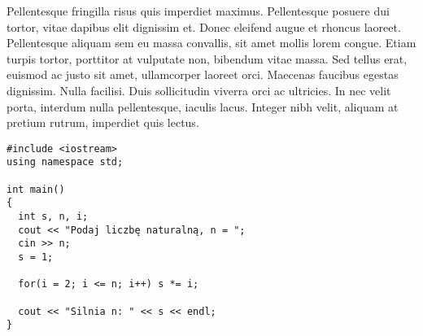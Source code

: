 \documentclass[11pt,a4paper]{article}
\begin{document}
Pellentesque fringilla risus quis imperdiet maximus. Pellentesque posuere dui tortor, vitae dapibus elit dignissim et. Donec eleifend augue et rhoncus laoreet. Pellentesque aliquam sem eu massa convallis, sit amet mollis lorem congue. Etiam turpis tortor, porttitor at vulputate non, bibendum vitae massa. Sed tellus erat, euismod ac justo sit amet, ullamcorper laoreet orci. Maecenas faucibus egestas dignissim. Nulla facilisi. Duis sollicitudin viverra orci ac ultricies. In nec velit porta, interdum nulla pellentesque, iaculis lacus. Integer nibh velit, aliquam at pretium rutrum, imperdiet quis lectus. 

\begin{lstlisting}[caption=tytuł1,label=lst:sil2,float=t,frame=single]
#include <iostream>
using namespace std;

int main()
{
  int s, n, i;  
  cout << "Podaj liczbę naturalną, n = ";
  cin >> n;
  s = 1;  
  
  for(i = 2; i <= n; i++) s *= i;  
  
  cout << "Silnia n: " << s << endl;
}
\end{lstlisting}
\end{document}
